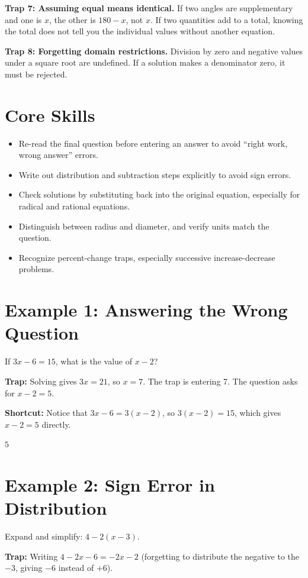 \documentclass[14pt]{extarticle}
\begin{document}
\textbf{Trap 7: Assuming equal means identical.} If two angles are supplementary and one is \(x\), the other is \(180 - x\), not \(x\). If two quantities add to a total, knowing the total does not tell you the individual values without another equation.

\textbf{Trap 8: Forgetting domain restrictions.} Division by zero and negative values under a square root are undefined. If a solution makes a denominator zero, it must be rejected.

\section*{Core Skills}
\begin{itemize}
  \item Re-read the final question before entering an answer to avoid ``right work, wrong answer'' errors.
  \item Write out distribution and subtraction steps explicitly to avoid sign errors.
  \item Check solutions by substituting back into the original equation, especially for radical and rational equations.
  \item Distinguish between radius and diameter, and verify units match the question.
  \item Recognize percent-change traps, especially successive increase-decrease problems.
\end{itemize}

\section*{Example 1: Answering the Wrong Question}

If \(3x - 6 = 15\), what is the value of \(x - 2\)?

\textbf{Trap:} Solving gives \(3x = 21\), so \(x = 7\). The trap is entering 7. The question asks for \(x - 2 = 5\).

\textbf{Shortcut:} Notice that \(3x - 6 = 3(x - 2)\), so \(3(x - 2) = 15\), which gives \(x - 2 = 5\) directly.

\(\boxed{5}\)

\section*{Example 2: Sign Error in Distribution}

Expand and simplify: \(4 - 2(x - 3)\).

\textbf{Trap:} Writing \(4 - 2x - 6 = -2x - 2\) (forgetting to distribute the negative to the \(-3\), giving \(-6\) instead of \(+6\)).
\end{document}
